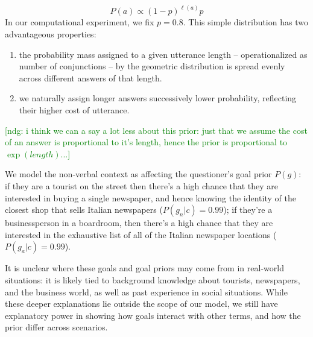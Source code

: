 \documentclass[12pt, floatsintext, jou]{apa6}
\newcommand{\ndg}[1]{\textcolor{Green}{[ndg: #1]}}
\begin{document}
$$P(a) \propto (1 - p)^{\ell(a)}p$$
In our computational experiment, we fix $p = 0.8$. 
This simple distribution has two advantageous properties: 
\begin{enumerate}[(1)]
\item the probability mass assigned to a given utterance length -- operationalized as number of conjunctions -- by the geometric distribution is spread evenly across different answers of that length.
\item we naturally assign longer answers successively lower probability, reflecting their higher cost of utterance. \end{enumerate}

\ndg{i think we can a say a lot less about this prior: just that we assume the cost of an answer is proportional to it's length, hence the prior is proportional to $\exp(length)$...}


We model the non-verbal context as affecting the questioner's goal prior $P(g)$: if they are a tourist on the street then there's a high chance that they are interested in buying a single newspaper, and hence knowing the identity of the closest shop that sells Italian newspapers ($P(g_n | c) = 0.99$); if they're a businessperson in a boardroom, then there's a high chance that they are interested in the exhaustive list of all of the Italian newspaper locations ($P(g_a | c) = 0.99$).


It is unclear where these goals and goal priors may come from in real-world situations: it is likely tied to background knowledge about tourists, newspapers, and the business world, as well as past experience in social situations. While these deeper explanations lie outside the scope of our model, we still have explanatory power in showing how goals interact with other terms, and how the prior differ across scenarios. 
\end{document}
